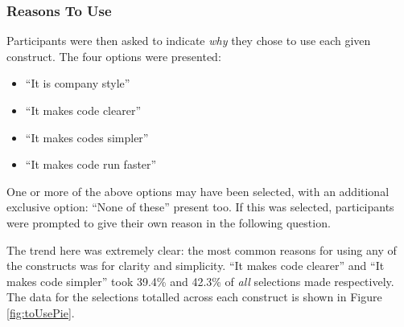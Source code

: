 \documentclass{article}
\begin{document}
        \subsubsection{Reasons To Use}
        \label{subsubsec:toUse}
            Participants were then asked to indicate \emph{why} they chose to use each given construct. The four options were presented:
            \begin{itemize}
                \item ``It is company style''
                \item ``It makes code clearer''
                \item ``It makes codes simpler''
                \item ``It makes code run faster''
            \end{itemize}
            One or more of the above options may have been selected, with an additional exclusive option: ``None of these'' present too. If this was selected, participants were prompted to give their own reason in the following question.
            \newline

            The trend here was extremely clear: the most common reasons for using any of the constructs was for clarity and simplicity. ``It makes code clearer'' and ``It makes code simpler'' took 39.4\% and 42.3\% of \emph{all} selections made respectively. The data for the selections totalled across each construct is shown in Figure \ref{fig:toUsePie}.
\end{document}
